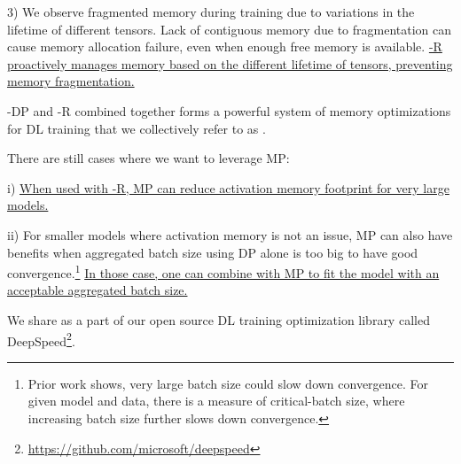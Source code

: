 3) We observe fragmented memory during training due to variations in the lifetime of different tensors. Lack of contiguous memory due to fragmentation can cause memory allocation failure, even when enough free memory is available. \uline{\name-R proactively manages memory based on the different lifetime of tensors, preventing memory fragmentation.}

\name-DP and \name-R combined together forms a powerful system of memory optimizations for DL training that we collectively refer to as \name.

There are still cases where we want to leverage MP:

i) \uline{When used with \name-R, MP can reduce activation memory footprint for very large models.}

ii) For smaller models where activation memory is not an issue, MP can also have benefits when aggregated batch size using DP alone is too big to have good convergence.\footnote{Prior work \cite{DBLP:journals/corr/batch-scaling} shows, very large batch size could slow down convergence.  For given model and data, there is a measure of critical-batch size, where increasing batch size further slows down convergence.}  \uline{In those case, one can combine \name with MP to fit the model with an acceptable aggregated batch size.}

We share \name as a part of our open source DL training optimization library called DeepSpeed\footnote{\url{https://github.com/microsoft/deepspeed}}.
